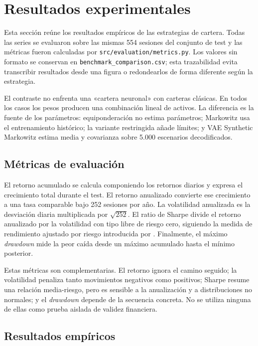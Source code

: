 \section{Resultados experimentales}

Esta sección reúne los resultados empíricos de las estrategias de cartera. Todas las series se evaluaron sobre las mismas 554 sesiones del conjunto de test y las métricas fueron calculadas por \texttt{src/evaluation/metrics.py}. Los valores sin formato se conservan en \texttt{benchmark\_comparison.csv}; esta trazabilidad evita transcribir resultados desde una figura o redondearlos de forma diferente según la estrategia.

El contraste no enfrenta una «cartera neuronal» con carteras clásicas. En todos los casos los pesos producen una combinación lineal de activos. La diferencia es la fuente de los parámetros: equiponderación no estima parámetros; Markowitz usa el entrenamiento histórico; la variante restringida añade límites; y VAE Synthetic Markowitz estima media y covarianza sobre 5.000 escenarios decodificados.

\subsection{Métricas de evaluación}

El retorno acumulado se calcula componiendo los retornos diarios y expresa el crecimiento total durante el test. El retorno anualizado convierte ese crecimiento a una tasa comparable bajo 252 sesiones por año. La volatilidad anualizada es la desviación diaria multiplicada por $\sqrt{252}$. El ratio de Sharpe divide el retorno anualizado por la volatilidad con tipo libre de riesgo cero, siguiendo la medida de rendimiento ajustado por riesgo introducida por \cite{sharpe1966mutual}. Finalmente, el máximo \textit{drawdown} mide la peor caída desde un máximo acumulado hasta el mínimo posterior.

Estas métricas son complementarias. El retorno ignora el camino seguido; la volatilidad penaliza tanto movimientos negativos como positivos; Sharpe resume una relación media-riesgo, pero es sensible a la anualización y a distribuciones no normales; y el \textit{drawdown} depende de la secuencia concreta. No se utiliza ninguna de ellas como prueba aislada de validez financiera.

\subsection{Resultados empíricos}

